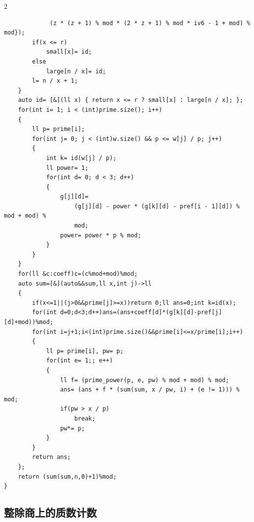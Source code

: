 \documentclass[UTF8,fontset=fandol,a4paper,twoside]{ctexart}
\begin{document}
\begin{multicols}{2}
\begin{lstlisting}
             (z * (z + 1) % mod * (2 * z + 1) % mod * iv6 - 1 + mod) % mod});
        if(x <= r)
            small[x]= id;
        else
            large[n / x]= id;
        l= n / x + 1;
    }
    auto id= [&](ll x) { return x <= r ? small[x] : large[n / x]; };
    for(int i= 1; i < (int)prime.size(); i++)
    {
        ll p= prime[i];
        for(int j= 0; j < (int)w.size() && p <= w[j] / p; j++)
        {
            int k= id(w[j] / p);
            ll power= 1;
            for(int d= 0; d < 3; d++)
            {
                g[j][d]=
                    (g[j][d] - power * (g[k][d] - pref[i - 1][d]) % mod + mod) %
                    mod;
                power= power * p % mod;
            }
        }
    }
    for(ll &c:coeff)c=(c%mod+mod)%mod;
    auto sum=[&](auto&&sum,ll x,int j)->ll
    {
        if(x<=1||(j>0&&prime[j]>=x))return 0;ll ans=0;int k=id(x);
        for(int d=0;d<3;d++)ans=(ans+coeff[d]*(g[k][d]-pref[j][d]+mod))%mod;
        for(int i=j+1;i<(int)prime.size()&&prime[i]<=x/prime[i];i++)
        {
            ll p= prime[i], pw= p;
            for(int e= 1;; e++)
            {
                ll f= (prime_power(p, e, pw) % mod + mod) % mod;
                ans= (ans + f * (sum(sum, x / pw, i) + (e != 1))) % mod;
                if(pw > x / p)
                    break;
                pw*= p;
            }
        }
        return ans;
    };
    return (sum(sum,n,0)+1)%mod;
}
\end{lstlisting}
\subsection{整除商上的质数计数}


\end{multicols}
\end{document}

